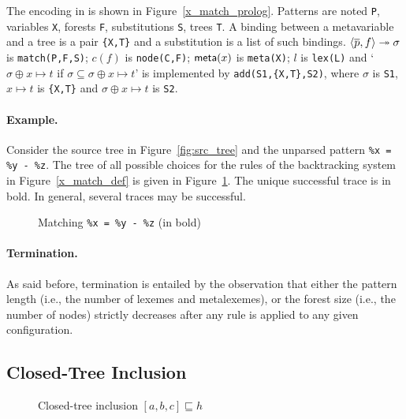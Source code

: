The encoding in \Prolog is shown in Figure~\ref{x_match_prolog}. Patterns
are noted \texttt{P}, variables \texttt{X}, forests \texttt{F},
substitutions \texttt{S}, trees \texttt{T}. A binding between a
meta\-variable and a tree is a pair \texttt{\{X,T\}} and a
substitution is a list of such
bindings. \(\smj{f}{\overline{p}}{\sigma}\) is \texttt{match(P,F,S)};
\(c(f)\) is \texttt{node(C,F)}; \(\meta{x}\) is \texttt{meta(X)};
\(l\) is \texttt{lex(L)} and `\(\sigma \oplus x \mapsto t\) if
\(\sigma \subseteq \sigma \oplus x \mapsto t\)' is implemented by
\texttt{add(S1,\{X,T\},S2)}, where \(\sigma\) is \texttt{S1}, \(x
\mapsto t\) is \texttt{\{X,T\}} and \(\sigma \oplus x \mapsto t\) is
\texttt{S2}.

\paragraph{Example.}

Consider the source tree in Figure~\ref{fig:src_tree} and the unparsed
pattern \texttt{\%x = \%y - \%z}. The tree of all possible choices for
the rules of the backtracking system in Figure~\ref{x_match_def} is
given in Figure~\ref{fig:backtracking_example}. The unique successful
trace is in bold. In general, several traces may be successful.
\begin{figure}[H]
\caption{Matching \texttt{\%x = \%y - \%z} (in bold)}
\label{fig:backtracking_example}
\end{figure}


\paragraph{Termination.} 

As said before, termination is entailed by the observation that either
the pattern length (i.e., the number of lexemes and meta\-lexemes), or
the forest size (i.e., the number of nodes) strictly decreases after
any rule is applied to any given configuration.


\subsection{Closed\hyp{}Tree Inclusion}

\begin{figure}[b]
\caption{Closed\hyp{}tree inclusion \([a,b,c] \sqsubseteq h\)}
\label{fig:sqsubseteq}
\end{figure}

